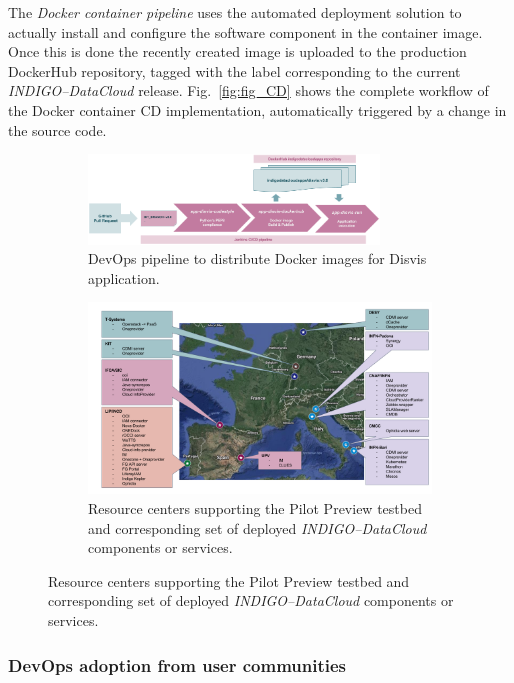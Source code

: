 \documentclass[journal]{IEEEtran}
\begin{document}
The \textit{Docker container pipeline} uses the automated deployment solution to
actually install and configure the software component in the container image. Once this is
done the recently created image is uploaded to the production DockerHub repository, tagged
with the label corresponding to the current {\sl INDIGO--DataCloud} release.
Fig.~\ref{fig:fig_CD} shows the complete workflow of the Docker container CD implementation,
automatically triggered by a change in the source code.

\begin{figure}
	\centering
	\begin{subfigure}
		\centering
\includegraphics[width=0.85\textwidth]{images/disvis-flow.png}
\caption{DevOps pipeline to distribute Docker images for Disvis application.}
\label{fig:fig_disvis}
	\end{subfigure}
	\quad
	\begin{subfigure}
		\centering
\includegraphics[width=\textwidth]{images/pilotpreview.png}
\caption{Resource centers supporting the Pilot Preview testbed and corresponding
set of deployed {\sl INDIGO--DataCloud} components or services.}
\label{fig:fig_pilotpreview}
	\end{subfigure}
\end{figure}


\subsubsection{DevOps adoption from user communities}
\end{document}

